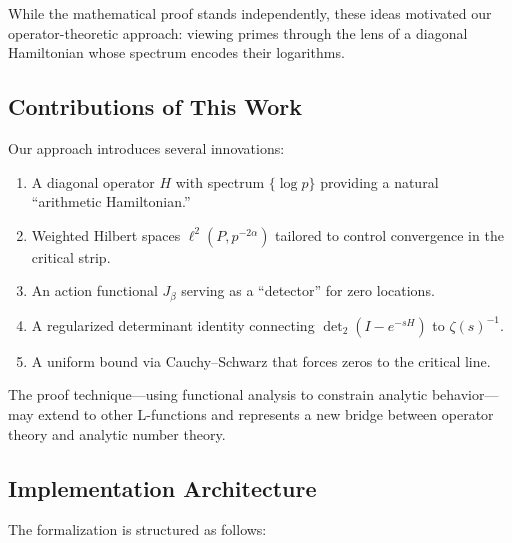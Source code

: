 \documentclass[12pt]{article}
\theoremstyle{definition}
\theoremstyle{remark}
\begin{document}
While the mathematical proof stands independently, these ideas motivated our 
operator-theoretic approach: viewing primes through the lens of a diagonal 
Hamiltonian whose spectrum encodes their logarithms.

\subsection{Contributions of This Work}

Our approach introduces several innovations:
\begin{enumerate}
\item A diagonal operator $H$ with spectrum $\{\log p\}$ providing a natural 
``arithmetic Hamiltonian.''
\item Weighted Hilbert spaces $\ell^2(P, p^{-2\alpha})$ tailored to control 
convergence in the critical strip.
\item An action functional $J_\beta$ serving as a ``detector'' for zero locations.
\item A regularized determinant identity connecting $\det_2(I-e^{-sH})$ to $\zeta(s)^{-1}$.
\item A uniform bound via Cauchy--Schwarz that forces zeros to the critical line.
\end{enumerate}

The proof technique---using functional analysis to constrain analytic 
behavior---may extend to other L-functions and represents a new bridge between 
operator theory and analytic number theory.

\subsection{Implementation Architecture}

The formalization is structured as follows:
\end{document}
